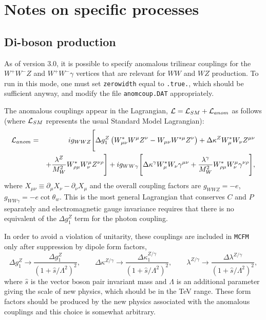 \documentclass[12pt]{article}
\begin{document}
\section{Notes on specific processes}
\label{sec:specific}

\subsection{Di-boson production}

As of version 3.0, it is possible to specify anomalous trilinear
couplings for the $W^+W^-Z$ and $W^+W^-\gamma$ vertices that are
relevant for $WW$ and $WZ$ production. To run in this mode, one
must set {\tt zerowidth} equal to {\tt .true.}, which should be
sufficient anyway, and modify the file {\tt anomcoup.DAT}
appropriately.

The anomalous couplings appear in the Lagrangian,
${\cal L} = {\cal L}_{SM} + {\cal L}_{anom}$ as follows
(where ${\cal L}_{SM}$ represents the usual Standard Model Lagrangian):
\begin{eqnarray}
{\cal L}_{anom} & = & i g_{WWZ} \Biggl[
 \Delta g_1^Z \left( W^*_{\mu\nu}W^\mu Z^\nu - W_{\mu\nu}W^{*\mu} Z^\nu \right)
+\Delta\kappa^Z W^*_\mu W_\nu Z^{\mu\nu} \nonumber \\
 & &+
 \frac{\lambda^Z}{M_W^2} W^*_{\rho\mu} W^\mu_\nu Z^{\nu\rho} \Biggr]
+i g_{WW\gamma} \Biggl[ 
 \Delta\kappa^\gamma W^*_\mu W_\nu \gamma^{\mu\nu}
+\frac{\lambda^\gamma}{M_W^2} W^*_{\rho\mu} W^\mu_\nu\gamma^{\nu\rho}
 \Biggr], \nonumber
\end{eqnarray}
where $X_{\mu\nu} \equiv \partial_\mu X_{\nu} - \partial_\nu X_{\mu}$
and the overall coupling factors are $g_{WWZ}=-e$,
$g_{WW\gamma}=-e\cot\theta_w$.
This is the most general Lagrangian that conserves $C$ and $P$
separately and electromagnetic gauge invariance requires that there
is no equivalent of the $\Delta g_1^Z$ term for the photon coupling.

In order to avoid a violation of unitarity, these couplings are included
in {\tt MCFM} only after suppression by dipole form factors,
\begin{displaymath}
\Delta g_1^Z \rightarrow \frac{\Delta g_1^Z}{(1+\hat{s}/\Lambda^2)^2}, \qquad
\Delta \kappa^{Z/\gamma} \rightarrow
 \frac{\Delta \kappa_1^{Z/\gamma}}{(1+\hat{s}/\Lambda^2)^2}, \qquad
\lambda^{Z/\gamma} \rightarrow
 \frac{\Delta \lambda^{Z/\gamma}}{(1+\hat{s}/\Lambda^2)^2},
\end{displaymath}
where $\hat{s}$ is the vector boson pair invariant mass and $\Lambda$
is an additional parameter giving the scale of new physics, which should
be in the TeV range.
These form factors should be produced by the new physics associated with the
anomalous couplings and this choice is somewhat arbitrary.
\end{document}
